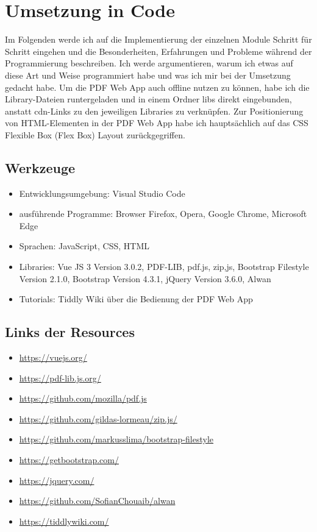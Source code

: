 \section{Umsetzung in Code}
Im Folgenden werde ich auf die Implementierung der einzelnen Module Schritt für Schritt eingehen und die Besonderheiten, Erfahrungen und Probleme während der Programmierung beschreiben. Ich werde argumentieren, warum ich etwas auf diese Art und Weise programmiert habe und was ich mir bei der Umsetzung gedacht habe. Um die PDF Web App auch offline nutzen zu können, habe ich die Library-Dateien runtergeladen und in einem Ordner libs direkt eingebunden, anstatt \gls{cdn}-Links zu den jeweiligen Libraries zu verknüpfen. Zur Positionierung von HTML-Elementen in der PDF Web App habe ich hauptsächlich auf das CSS Flexible Box (Flex Box) Layout zurückgegriffen. 

\subsection{Werkzeuge}
\begin{itemize}
	\item Entwicklungsumgebung: Visual Studio Code
	\item ausführende Programme: Browser Firefox, Opera, Google Chrome, Microsoft Edge
	\item Sprachen: JavaScript, CSS, HTML
	\item Libraries: Vue JS 3 Version 3.0.2, PDF-LIB, pdf.js, zip,js, Bootstrap Filestyle Version 2.1.0, Bootstrap Version 4.3.1, jQuery Version 3.6.0, Alwan
	\item Tutorials: Tiddly Wiki über die Bedienung der PDF Web App
\end{itemize}

\subsection{Links der Resources}
\begin{itemize}
	\item \url{https://vuejs.org/}
	\item \url{https://pdf-lib.js.org/}
	\item \url{https://github.com/mozilla/pdf.js}
	\item \url{https://github.com/gildas-lormeau/zip.js/}
	\item \url{https://github.com/markusslima/bootstrap-filestyle}
	\item \url{https://getbootstrap.com/}
	\item \url{https://jquery.com/}
	\item \url{https://github.com/SofianChouaib/alwan}
	\item \url{https://tiddlywiki.com/}
\end{itemize}

